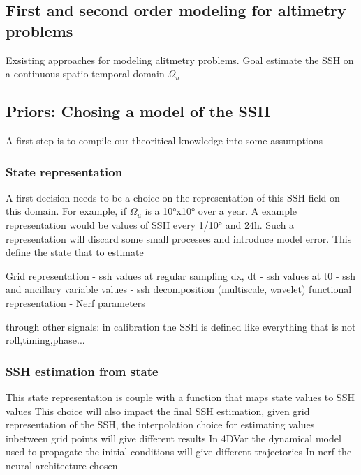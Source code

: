 \begin{bibunit}

  \chapter*{First and second order modeling for altimetry problems}
 
 Exsisting approaches for modeling alitmetry problems.
 Goal estimate the SSH on a continuous spatio-temporal domain $\Omega_u$
 
 
  \section{Priors: Chosing a model of the SSH}
A first step is to compile our theoritical knowledge into some assumptions 

 
  \subsection{State representation}
A first decision needs to be a choice on the representation of this SSH field on this domain. For example, if $\Omega_u$ is a 10°x10° over a year. A example representation would be values of SSH every 1/10° and 24h. Such a representation will discard some small processes and introduce model error.
This define the state that to estimate

 Grid representation
     - ssh values at regular sampling dx, dt
     - ssh values at t0
     - ssh and ancillary variable values
     - ssh decomposition (multiscale, wavelet)
  functional representation
     - Nerf parameters

  through other signals:
      in calibration the SSH is defined like everything that is not roll,timing,phase...
      
  \subsection{SSH estimation from state}
This state representation is couple with a function that maps state values to SSH values 
This choice will also impact the final SSH estimation, given grid representation of the SSH, the interpolation choice for estimating values inbetween grid points will give different results
In 4DVar the dynamical model used to propagate the initial conditions will give different trajectories
In nerf the neural architecture chosen 



\end{bibunit}
